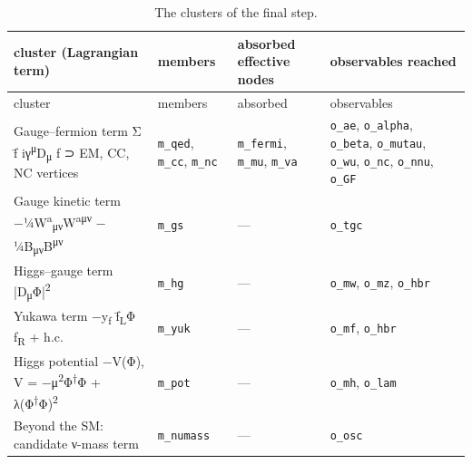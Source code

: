 \begin{longtable}{@{}>{\raggedright\arraybackslash}p{4.2cm}>{\raggedright\arraybackslash}p{4.4cm}>{\raggedright\arraybackslash}p{3.1cm}>{\raggedright\arraybackslash}p{3.1cm}@{}}
\caption{The clusters of the final step.}\label{tab:clusters}\\
\toprule cluster (Lagrangian term) & members & absorbed effective nodes & observables reached\\\midrule\endfirsthead
\toprule cluster & members & absorbed & observables\\\midrule\endhead
\bottomrule\endfoot
Gauge–fermion term Σ f̄ iγ\textsuperscript{μ}D\textsubscript{μ} f ⊃ EM, CC, NC vertices & \texttt{m\_qed}, \texttt{m\_cc}, \texttt{m\_nc} & \texttt{m\_fermi}, \texttt{m\_mu}, \texttt{m\_va} & \texttt{o\_ae}, \texttt{o\_alpha}, \texttt{o\_beta}, \texttt{o\_mutau}, \texttt{o\_wu}, \texttt{o\_nc}, \texttt{o\_nnu}, \texttt{o\_GF}\\
Gauge kinetic term −¼W\textsuperscript{a}\textsubscript{μν}W\textsuperscript{aμν} − ¼B\textsubscript{μν}B\textsuperscript{μν} & \texttt{m\_gs} & --- & \texttt{o\_tgc}\\
Higgs–gauge term |D\textsubscript{μ}Φ|\textsuperscript{2} & \texttt{m\_hg} & --- & \texttt{o\_mw}, \texttt{o\_mz}, \texttt{o\_hbr}\\
Yukawa term −y\textsubscript{f} f̄\textsubscript{L}Φ f\textsubscript{R} + h.c. & \texttt{m\_yuk} & --- & \texttt{o\_mf}, \texttt{o\_hbr}\\
Higgs potential −V(Φ), V = −μ\textsuperscript{2}Φ\textsuperscript{†}Φ + λ(Φ\textsuperscript{†}Φ)\textsuperscript{2} & \texttt{m\_pot} & --- & \texttt{o\_mh}, \texttt{o\_lam}\\
Beyond the SM: candidate ν-mass term & \texttt{m\_numass} & --- & \texttt{o\_osc}\\
\end{longtable}
